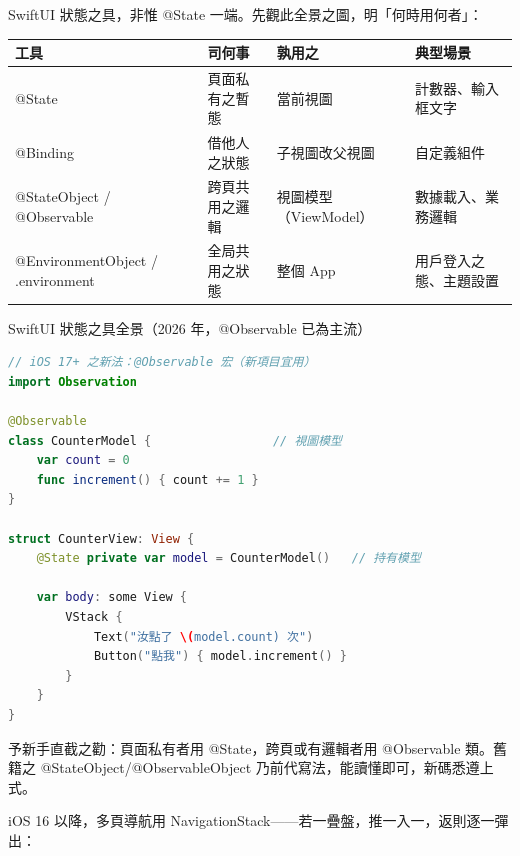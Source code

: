 


SwiftUI 狀態之具，非惟 @State 一端。先觀此全景之圖，明「何時用何者」：

\begin{center}
\begin{tabularx}{\linewidth}{|X|X|X|X|}
\hline
\textbf{工具} & \textbf{司何事} & \textbf{孰用之} & \textbf{典型場景} \tabularnewline
\hline
@State & 頁面私有之暫態 & 當前視圖 & 計數器、輸入框文字 \tabularnewline
@Binding & 借他人之狀態 & 子視圖改父視圖 & 自定義組件 \tabularnewline
@StateObject / @Observable & 跨頁共用之邏輯 & 視圖模型（ViewModel） & 數據載入、業務邏輯 \tabularnewline
@EnvironmentObject / .environment & 全局共用之狀態 & 整個 App & 用戶登入之態、主題設置 \tabularnewline
\hline
\end{tabularx}
\end{center}

\begin{center}\small\color{gray}SwiftUI 狀態之具全景（2026 年，@Observable 已為主流）\end{center}

\begin{lstlisting}[language=Swift]
// iOS 17+ 之新法：@Observable 宏（新項目宜用）
import Observation

@Observable
class CounterModel {                 // 視圖模型
    var count = 0
    func increment() { count += 1 }
}

struct CounterView: View {
    @State private var model = CounterModel()   // 持有模型

    var body: some View {
        VStack {
            Text("汝點了 \(model.count) 次")
            Button("點我") { model.increment() }
        }
    }
}
\end{lstlisting}

予新手直截之勸：頁面私有者用 @State，跨頁或有邏輯者用 @Observable 類。舊籍之 @StateObject/@ObservableObject 乃前代寫法，能讀懂即可，新碼悉遵上式。


iOS 16 以降，多頁導航用 NavigationStack——若一疊盤，推一入一，返則逐一彈出：

